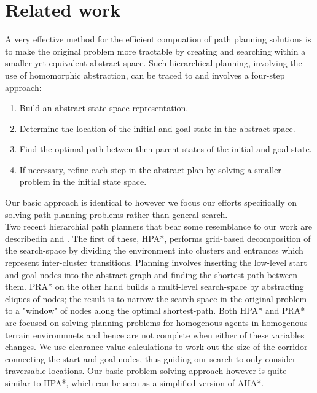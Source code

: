 \documentclass[a4paper]{article}
\begin{document}
\section{Related work}
A very effective method for the efficient compuation of path planning solutions is to make the original problem more tractable by creating and searching within a smaller yet equivalent abstract space. Such hierarchical planning, involving the use of homomorphic abstraction, can be traced to \cite{holte96} and involves a four-step approach:
\begin{enumerate}
\item{Build an abstract state-space representation.}
\item{Determine the location of the initial and goal state in the abstract space.}
\item{Find the optimal path betwen then parent states of the initial and goal state. }
\item{If necessary, refine each step in the abstract plan by solving a smaller problem in the initial state space.}
\end{enumerate}
Our basic approach is identical to \cite{holte96} however we focus our efforts specifically on solving path planning problems rather than general search. \\ \newline 
Two recent hierarchial path planners that bear some resemblance to our work are describedin \cite{hpa} and \cite{pra}. The first of these, HPA*, performs grid-based decomposition of the search-space by dividing the environment into clusters and entrances which represent inter-cluster transitions. Planning involves inserting the low-level start and goal nodes into the abstract graph and finding the shortest path between them. 
PRA* on the other hand builds a multi-level search-space by abstracting cliques of nodes; the result is to narrow the search space in the original problem to a "window" of nodes along the optimal shortest-path.\newline
Both HPA* and PRA* are focused on solving planning problems for homogenous agents in homogenous-terrain environmnets and hence are not complete when either of these variables changes. We use clearance-value calculations to work out the size of the corridor connecting the start and goal nodes, thus guiding our search to only consider traversable locations. Our basic problem-solving approach however is quite similar to HPA*, which can be seen as a simplified version of AHA*. \\ \newline
\end{document}
